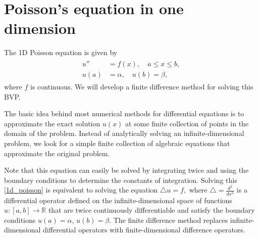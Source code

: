 \section{Poisson's equation in one dimension}
The 1D Poisson equation is given by 
\begin{align}
	\begin{split}
u'' &= f(x), \quad a \leq x \leq b,\\
	u(a) &= \alpha,\quad u(b) = \beta,
	\end{split} \label{1d_poisson}
\end{align}
where $f$ is continuous.  We will develop a finite difference method for solving this BVP. 

The basic idea behind most numerical methods for differential equations is to 
approximate the exact solution $u(x)$ at some finite collection of points in the 
domain of the problem. Instead of analytically solving an infinite-dimensional
problem, we look for a simple finite collection of algebraic equations that approximate the original problem.

Note that this equation can easily be solved by integrating twice 
and using the boundary conditions to determine the constants of integration. 
Solving this \eqref{1d_poisson} is equivalent to solving the equation $\triangle u = f,$
where $\triangle = \frac{d^2}{dx^2}$ is a differential operator defined on the infinite-dimensional space 
of functions $u:[a,b] \to \mathbb{R}$ that are twice continuously differentiable and 
satisfy the boundary conditions $u(a) = \alpha$, $u(b) = \beta$. The finite difference method replaces infinite-dimensional differential operators with finite-dimensional difference operators. 

